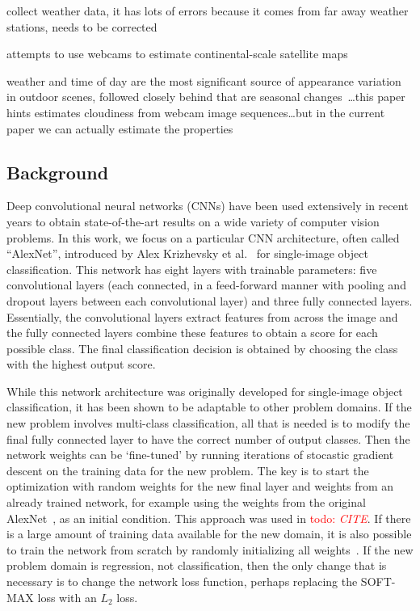 \documentclass{article}
\newcommand{\todo}[1]{\textcolor{red}{todo: {\em #1}}}
\begin{document}
collect weather data, it has lots of errors because it comes from far
away weather stations, needs to be corrected~\cite{islam13webcamweather}

attempts to use webcams to estimate continental-scale satellite
maps~\cite{murdock13clouds}

weather and time of day are the most significant source of appearance
variation in outdoor scenes, followed closely behind that are seasonal
changes~\cite{jacobs07amos}\dots this paper hints estimates 
cloudiness from webcam image sequences\dots but in
the current paper we can actually estimate the properties


\subsection{Background}

Deep convolutional neural networks (CNNs) have been used extensively
in recent years to obtain state-of-the-art results on a wide variety
of computer vision problems.  In this work, we focus on a particular
CNN architecture, often called ``AlexNet'', introduced by Alex
Krizhevsky et al.~\cite{caffenetnips12} for single-image object
classification. This network has eight layers with trainable
parameters: five convolutional layers (each connected, in a
feed-forward manner with pooling and dropout layers between each
convolutional layer) and three fully connected layers. Essentially,
the convolutional layers extract features from across the image and
the fully connected layers combine these features to obtain a score
for each possible class. The final classification decision is obtained
by choosing the class with the highest output score.

While this network architecture was originally developed for
single-image object classification, it has been shown to be adaptable
to other problem domains. If the new problem involves multi-class
classification, all that is needed is to modify the final fully
connected layer to have the correct number of output classes. Then the
network weights can be `fine-tuned' by running iterations of stocastic
gradient descent on the training data for the new problem.  The key is
to start the optimization with random weights for the new final layer
and weights from an already trained network, for example using the
weights from the original AlexNet~\cite{caffenetnips12}, as an initial
condition. This approach was used in \todo{CITE}. If there is a large
amount of training data available for the new domain, it is also
possible to train the network from scratch by randomly initializing
all weights~\cite{zhou2014places}.  If the new problem domain is
regression, not classification, then the only change that is necessary
is to change the network loss function, perhaps replacing the SOFT-MAX
loss with an $L_2$ loss.
\end{document}
